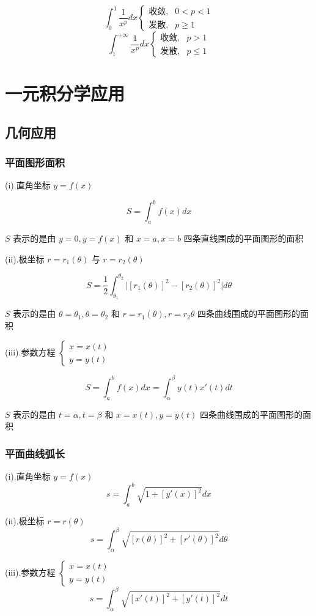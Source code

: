 \begin{corollary}[p级数判别法]
	$$\int_{0}^{1}\frac{1}{x^{p}}dx\begin{cases} \text{收敛}, &0 < p < 1 \\ \text{发散},& p\geq 1  \end{cases}$$
	$$\int_{1}^{+\infty}\frac{1}{x^{p}}dx\begin{cases} \text{收敛}, &p > 1 \\ \text{发散},& p\leq 1  \end{cases}$$
\end{corollary}

\section{一元积分学应用}

\subsection{几何应用}
\subsubsection{平面图形面积}
\begin{definition}[定积分几何意义]

	(i).直角坐标 $y=f(x)$

	$$S=\int_{a}^{b}f(x)dx$$

	$S$ 表示的是由 $y=0,y=f(x)$ 和 $x=a,x=b$ 四条直线围成的平面图形的面积

	(ii).极坐标 $r=r_{1}(\theta)$ 与 $r=r_{2}(\theta)$

	$$S=\dfrac{1}{2}\int_{\theta_{1}}^{\theta_{2}}\big|[r_{1}(\theta)]^{2}-[r_{2}(\theta)]^{2}\big|d\theta$$

	$S$ 表示的是由 $\theta=\theta_{1},\theta=\theta_{2}$ 和 $r=r_{1}(\theta),r=r_{2}\theta$ 四条曲线围成的平面图形的面积

	(iii).参数方程 
	$\begin{cases}
		x=x(t) \\
		y=y(t)
	\end{cases}$

	$$S=\int_{a}^{b}f(x)dx = \int_{\alpha}^{\beta}y(t)x'(t)dt$$

	$S$ 表示的是由 $t=\alpha,t=\beta$ 和 $x=x(t),y=y(t)$ 四条曲线围成的平面图形的面积
	
\end{definition}
\subsubsection{平面曲线弧长}
\begin{theorem}[平面曲线的弧长]

	(i).直角坐标 $y=f(x)$
	$$s=\int_{a}^{b}\sqrt{1+[y'(x)]^{2}}dx$$

	(ii).极坐标 $r=r(\theta)$
	$$s=\int_{\alpha}^{\beta}\sqrt{[r(\theta)]^{2}+[r'(\theta)]^{2}}d\theta$$

	(iii).参数方程 $\begin{cases}
		x=x(t) \\
		y=y(t)
	\end{cases}$
	$$s=\int_{\alpha}^{\beta}\sqrt{[x'(t)]^{2}+[y'(t)]^{2}}dt$$
\end{theorem}
